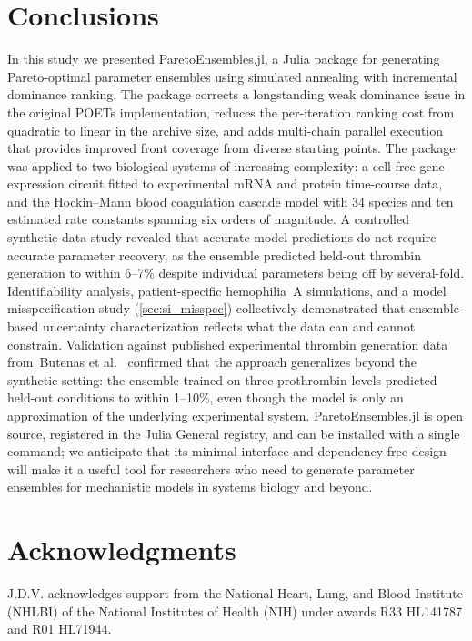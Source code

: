 \documentclass[preprint,review,12pt]{elsarticle}
\begin{document}
\section{Conclusions}\label{sec:conclusions}
In this study we presented ParetoEnsembles.jl, a Julia package for generating Pareto-optimal parameter ensembles using simulated annealing with incremental dominance ranking. The package corrects a longstanding weak dominance issue in the original POETs implementation, reduces the per-iteration ranking cost from quadratic to linear in the archive size, and adds multi-chain parallel execution that provides improved front coverage from diverse starting points. The package was applied to two biological systems of increasing complexity: a cell-free gene expression circuit fitted to experimental mRNA and protein time-course data, and the Hockin--Mann blood coagulation cascade model with 34 species and ten estimated rate constants spanning six orders of magnitude. A controlled synthetic-data study revealed that accurate model predictions do not require accurate parameter recovery, as the ensemble predicted held-out thrombin generation to within 6--7\% despite individual parameters being off by several-fold. Identifiability analysis, patient-specific hemophilia~A simulations, and a model misspecification study (\cref{sec:si_misspec}) collectively demonstrated that ensemble-based uncertainty characterization reflects what the data can and cannot constrain. Validation against published experimental thrombin generation data from~Butenas et al.~\cite{Butenas1999} confirmed that the approach generalizes beyond the synthetic setting: the ensemble trained on three prothrombin levels predicted held-out conditions to within 1--10\%, even though the model is only an approximation of the underlying experimental system. ParetoEnsembles.jl is open source, registered in the Julia General registry, and can be installed with a single command; we anticipate that its minimal interface and dependency-free design will make it a useful tool for researchers who need to generate parameter ensembles for mechanistic models in systems biology and beyond.

\section*{Acknowledgments}
J.D.V. acknowledges support from the National Heart, Lung, and Blood Institute (NHLBI) of the National Institutes of Health (NIH) under awards R33 HL141787 and R01 HL71944.
\end{document}
